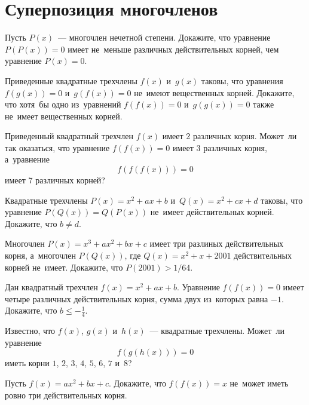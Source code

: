 
\section*{Суперпозиция многочленов}


\begin{problems}

\item
Пусть $P(x)$~— многочлен нечетной степени.
Докажите, что уравнение $P(P(x)) = 0$ имеет не~меньше различных действительных
корней, чем уравнение $P(x) = 0$.

\item
Приведенные квадратные трехчлены $f(x)$ и~$g(x)$ таковы, что уравнения
$f(g(x)) = 0$ и~$g(f(x)) = 0$ не~имеют вещественных корней.
Докажите, что хотя~бы одно из~уравнений $f(f(x)) = 0$ и~$g(g(x)) = 0$ также
не~имеет вещественных корней.

\item
Приведенный квадратный трехчлен $f(x)$ имеет 2 различных корня.
Может~ли так оказаться, что уравнение $f(f(x)) = 0$ имеет 3 различных корня,
а~уравнение
\[
    f(f(f(x))) = 0
\]
имеет 7 различных корней?

\item
Квадратные трехчлены $P(x) = x^2 + a x + b$ и~$Q(x) = x^2 + c x + d$ таковы,
что уравнение $P(Q(x)) = Q(P(x))$ не~имеет действительных корней.
Докажите, что $b \neq d$.

\item
Многочлен $P(x) = x^3 + a x^2 + b x + c$ имеет три разлиных действительных
корня, а~многочлен $P(Q(x))$, где $Q(x) = x^2 + x + 2001$ действительных корней
не~имеет.
Докажите, что $P(2001) > 1 / 64$.

\item
Дан квадратный трехчлен $f(x) = x^2 + a x + b$.
Уравнение $f(f(x)) = 0$ имеет четыре различных действительных корня, сумма двух
из~которых равна $-1$.
Докажите, что $b \leq -\frac{1}{4}$.

\item
Известно, что $f(x)$, $g(x)$ и~$h(x)$~— квадратные трехчлены.
Может~ли уравнение
\[
    f(g(h(x))) = 0
\]
иметь корни $1$, $2$, $3$, $4$, $5$, $6$, $7$ и~$8$?

\item
Пусть $f(x) = a x^2 + b x + c$.
Докажите, что $f(f(x)) = x$ не~может иметь ровно три действительных корня.

\end{problems}

